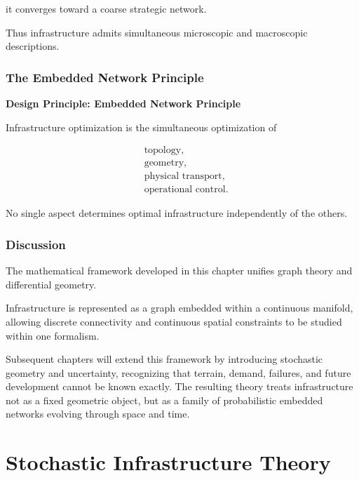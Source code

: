 \documentclass[11pt,fleqn]{book}
\numberwithin{equation}{chapter}
\newenvironment{principle}[1]
  {\begin{principleEnv}
   \noindent\textbf{Design Principle: #1}\par\smallskip\itshape}
  {\end{principleEnv}}
\theoremstyle{plain}
\theoremstyle{definition}
\theoremstyle{remark}
\begin{document}
it converges toward a coarse strategic network.

Thus infrastructure admits simultaneous microscopic and macroscopic
descriptions.


\section{The Embedded Network Principle}

\begin{principle}{Embedded Network Principle}

Infrastructure optimization is the simultaneous optimization of

\[
\begin{aligned}
&
\text{topology},\\
&
\text{geometry},\\
&
\text{physical transport},\\
&
\text{operational control}.
\end{aligned}
\]

No single aspect determines optimal infrastructure independently of the
others.

\end{principle}


\section{Discussion}

The mathematical framework developed in this chapter unifies graph
theory and differential geometry.

Infrastructure is represented as a graph embedded within a continuous
manifold, allowing discrete connectivity and continuous spatial
constraints to be studied within one formalism.

Subsequent chapters will extend this framework by introducing stochastic
geometry and uncertainty, recognizing that terrain, demand, failures,
and future development cannot be known exactly. The resulting theory
treats infrastructure not as a fixed geometric object, but as a family
of probabilistic embedded networks evolving through space and time.

\part{Stochastic Infrastructure Theory}
\end{document}
